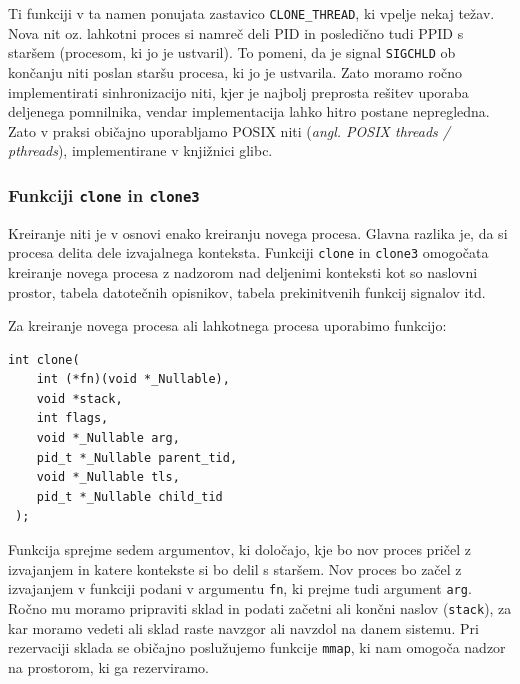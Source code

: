\documentclass[a4paper,12pt,openright]{book}
\begin{document}
Ti funkciji v ta namen ponujata zastavico \texttt{CLONE\_THREAD}, ki vpelje nekaj težav.
Nova nit oz. lahkotni proces si namreč deli PID in posledično tudi PPID s staršem (procesom, ki jo je ustvaril).
To pomeni, da je signal \texttt{SIGCHLD} ob končanju niti poslan staršu procesa, ki jo je ustvarila.
Zato moramo ročno implementirati sinhronizacijo niti, kjer je najbolj preprosta rešitev uporaba deljenega pomnilnika, vendar implementacija lahko hitro postane nepregledna.
Zato v praksi običajno uporabljamo POSIX niti (\textit{angl. POSIX threads / pthreads}), implementirane v knjižnici glibc.

\subsubsection{Funkciji \texttt{clone} in \texttt{clone3}}

Kreiranje niti je v osnovi enako kreiranju novega procesa.
Glavna razlika je, da si procesa delita dele izvajalnega konteksta.
Funkciji \texttt{clone} in \texttt{clone3} omogočata kreiranje novega procesa z nadzorom nad deljenimi konteksti kot so naslovni prostor, tabela datotečnih opisnikov, tabela prekinitvenih funkcij signalov itd.

Za kreiranje novega procesa ali lahkotnega procesa uporabimo funkcijo:
\begin{lstlisting}[style=func]
 int clone(
	int (*fn)(void *_Nullable),
	void *stack,
	int flags,
	void *_Nullable arg,
	pid_t *_Nullable parent_tid,
	void *_Nullable tls,
	pid_t *_Nullable child_tid
 );
\end{lstlisting}

Funkcija sprejme sedem argumentov, ki določajo, kje bo nov proces pričel z izvajanjem in katere kontekste si bo delil s staršem.
Nov proces bo začel z izvajanjem v funkciji podani v argumentu \texttt{fn}, ki prejme tudi argument \texttt{arg}.
Ročno mu moramo pripraviti sklad in podati začetni ali končni naslov (\texttt{stack}), za kar moramo vedeti ali sklad raste navzgor ali navzdol na danem sistemu.
Pri rezervaciji sklada se običajno poslužujemo funkcije \texttt{mmap}, ki nam omogoča nadzor na prostorom, ki ga rezerviramo.
\end{document}
